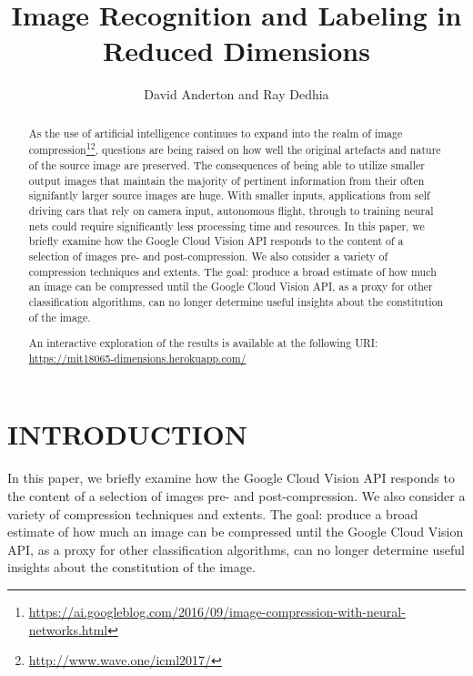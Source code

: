 \documentclass[letterpaper, 10 pt, conference]{ieeeconf}  %
\title{\LARGE \bf Image Recognition and Labeling in Reduced Dimensions}
\author{David Anderton and Ray Dedhia}
\begin{document}
\maketitle
\thispagestyle{empty}
\pagestyle{empty}


\begin{abstract}

As the use of artificial intelligence continues to expand into the realm of image compression\footnote{\url{https://ai.googleblog.com/2016/09/image-compression-with-neural-networks.html}}\footnote{\url{http://www.wave.one/icml2017/}}, questions are being raised on how well the original artefacts and nature of the source image are preserved. The consequences of being able to utilize smaller output images that maintain the majority of pertinent information from their often signifantly larger source images are huge. With smaller inputs, applications from self driving cars that rely on camera input, autonomous flight, through to training neural nets could require significantly less processing time and resources.
In this paper, we briefly examine how the Google Cloud Vision API responds to the content of a selection of images pre- and post-compression. We also consider a variety of compression techniques and extents. The goal: produce a broad estimate of how much an image can be compressed until the Google Cloud Vision API, as a proxy for other classification algorithms, can no longer determine useful insights about the constitution of the image.

An interactive exploration of the results is available at the following URI: \url{https://mit18065-dimensions.herokuapp.com/}

\end{abstract}

\section{INTRODUCTION}

In this paper, we briefly examine how the Google Cloud Vision API responds to the content of a selection of images pre- and post-compression. We also consider a variety of compression techniques and extents. The goal: produce a broad estimate of how much an image can be compressed until the Google Cloud Vision API, as a proxy for other classification algorithms, can no longer determine useful insights about the constitution of the image.
\end{document}
